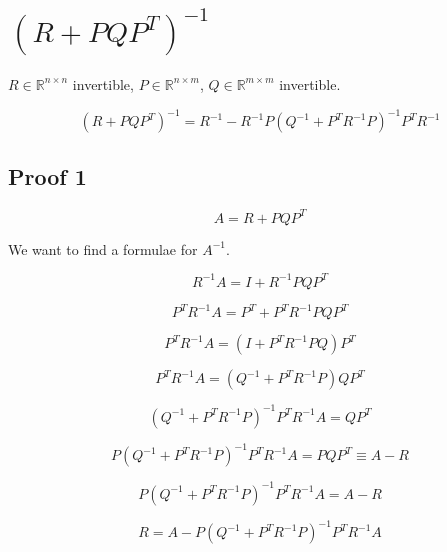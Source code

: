 \documentclass{article}
\begin{document}
\section{$(R + PQP^T)^{-1}$}

$R \in \mathbb{R}^{n\times n}$ invertible, $P \in \mathbb{R}^{n\times m}$, $Q \in \mathbb{R}^{m\times m}$ invertible.

\begin{equation}
    \boxed{(R + PQP^T)^{-1} = R^{-1} - R^{-1} P (Q^{-1} + P^T R^{-1}P)^{-1} P^T R^{-1}}
\end{equation}

\subsection{Proof 1}

\begin{equation}
    A = R + PQP^T
\end{equation}

We want to find a formulae for $A^{-1}$.

\begin{equation}
    R^{-1}A = I + R^{-1}PQP^T
\end{equation}

\begin{equation}
    P^T R^{-1} A = P^T + P^T R^{-1}PQP^T
\end{equation}

\begin{equation}
    P^T R^{-1} A = (I + P^T R^{-1}PQ) P^T
\end{equation}

\begin{equation}
    P^T R^{-1} A = (Q^{-1} + P^T R^{-1}P) QP^T
\end{equation}

\begin{equation}
    (Q^{-1} + P^T R^{-1}P)^{-1} P^T R^{-1} A =  QP^T
\end{equation}

\begin{equation}
    P (Q^{-1} + P^T R^{-1}P)^{-1} P^T R^{-1} A =  PQP^T \equiv A - R
\end{equation}

\begin{equation}
    P (Q^{-1} + P^T R^{-1}P)^{-1} P^T R^{-1} A = A - R
\end{equation}

\begin{equation}
    R = A - P (Q^{-1} + P^T R^{-1}P)^{-1} P^T R^{-1} A
\end{equation}
\end{document}
